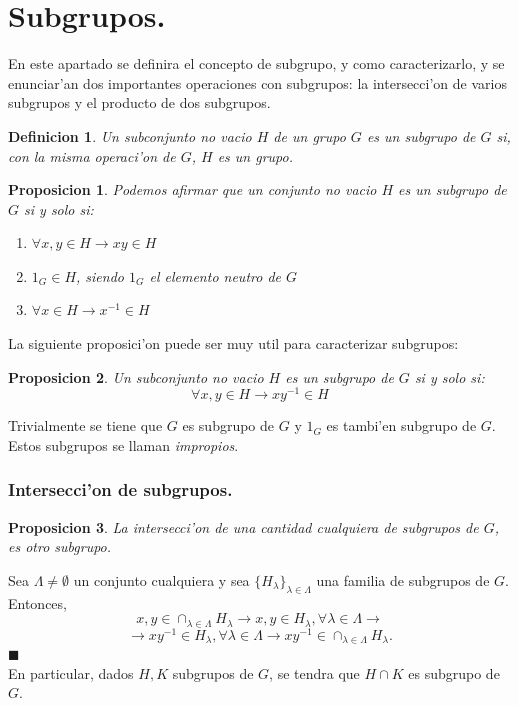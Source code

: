 \documentclass[a4paper,openright,12pt]{report}
\numberwithin{equation}{section} %
\newtheorem{proposicion}{Proposicion}[section] %
\newtheorem{definicion}{Definicion}[section] %
\newenvironment{proof}{\noindent{\it Demostracion:}}{\hfill$\blacksquare$} %
\begin{document}
\section{Subgrupos.}
En este apartado se definira el concepto de subgrupo, y como caracterizarlo,  y se enunciar'an dos importantes operaciones con subgrupos: la intersecci'on de varios subgrupos y el producto de dos subgrupos.
\begin{definicion}
Un subconjunto no vacio $H$ de un grupo $G$ es un subgrupo de $G$ si, con la misma operaci'on de $G$, $H$ es un grupo.
\end{definicion}
\begin{proposicion}
Podemos afirmar que un conjunto no vacio $H$ es un subgrupo de $G$ si y solo si:
\begin{enumerate}
\item $\forall x,y \in H \rightarrow xy \in H$
\item $1_{G}\in H$, siendo $1_{G}$ el elemento neutro de $G$
\item $\forall x \in H \rightarrow x^{-1} \in H$
\end{enumerate}
\end{proposicion}
La siguiente proposici'on puede ser muy util para caracterizar subgrupos:
\begin{proposicion}
Un subconjunto no vacio $H$ es un subgrupo de $G$ si y solo si:
\[
\forall x,y \in H \rightarrow xy^{-1}\in H
\]
\end{proposicion}
Trivialmente se tiene que $G$ es subgrupo de $G$ y $1_{G}$ es tambi'en subgrupo de $G$. Estos subgrupos se llaman \textit{impropios}.
\subsubsection{Intersecci'on de subgrupos.}
\begin{proposicion}
La intersecci'on de una cantidad cualquiera de subgrupos de $G$, es otro subgrupo.
\end{proposicion}
\begin{proof}
Sea $\Lambda \neq \emptyset$ un conjunto cualquiera y sea $\{H_{\lambda} \}_{\lambda \in \Lambda}$ una familia de subgrupos de $G$. Entonces,
\[
x,y \in \cap_{\lambda \in \Lambda}H_{\lambda}\rightarrow x,y \in H_{\lambda},\forall \lambda \in \Lambda \rightarrow
\]
\[
\rightarrow xy^{-1}\in H_{\lambda}, \forall \lambda \in \Lambda \rightarrow xy^{-1} \in \cap _{\lambda \in \Lambda}H_{\lambda}.
\]
\end{proof}
\\
En particular, dados $H,K$ subgrupos de $G$, se tendra que $H \cap K$ es subgrupo de $G$.
\end{document}

